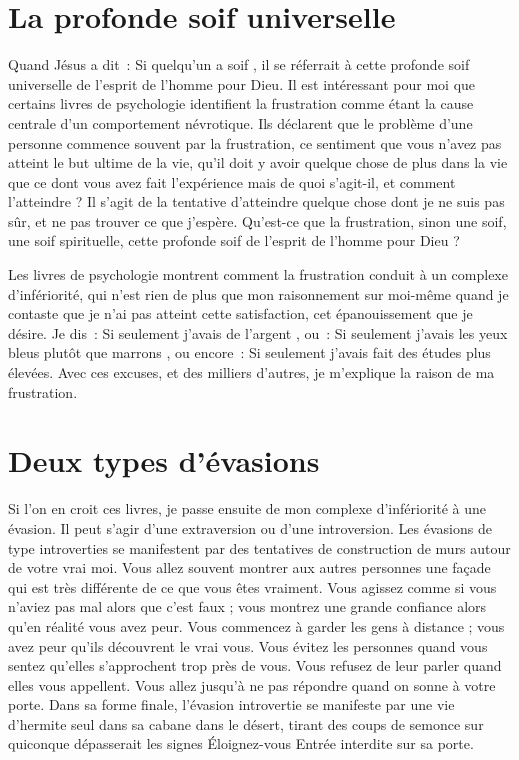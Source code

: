 \section*{La profonde soif universelle}

Quand Jésus a dit~: \og Si quelqu'un a soif \fg{}, il se réferrait
 à cette profonde soif universelle de l'esprit de l'homme pour Dieu.
 Il est intéressant pour moi que certains livres de psychologie
 identifient la frustration comme étant la cause centrale
 d'un comportement névrotique. Ils déclarent que le problème
 d'une personne commence souvent par la frustration,
 ce sentiment que vous n'avez pas atteint le but ultime de la vie,
 qu'il doit y avoir quelque chose de plus dans la vie que ce dont
 vous avez fait l'expérience \ocadr mais de quoi s'agit-il, et comment
 l'atteindre ?
 Il s'agit de la tentative d'atteindre quelque chose dont je ne suis pas sûr,
 et ne pas trouver ce que j'espère. Qu'est-ce que la frustration,
 sinon une soif, une soif spirituelle, cette profonde soif de l'esprit
 de l'homme pour Dieu ?

Les livres de psychologie montrent comment la frustration conduit
 à un complexe d'infériorité, qui n'est rien de plus que mon raisonnement
 sur moi-même quand je contaste que je n'ai pas atteint cette satisfaction,
 cet épanouissement que je désire. Je dis~:
 \og Si seulement j'avais de l'argent \fg{}, ou~:
 \og Si seulement j'avais les yeux bleus plutôt que marrons \fg{}, ou encore~:
 \og Si seulement j'avais fait des études plus élevées. \fg{}
 Avec ces excuses, et des milliers d'autres, je m'explique la raison
 de ma frustration.


\section*{Deux types d'évasions}

\begin{specialpar}{}
Si l'on en croit ces livres, je passe ensuite de mon complexe
 d'in\-fé\-rio\-ri\-té à une évasion.
 Il peut s'agir d'une extraversion ou d'une introversion.
 Les évasions de type introverties se manifestent par des tentatives
 de construction de murs autour de votre vrai moi.
 Vous allez souvent montrer aux autres personnes une façade qui est très
 différente de ce que vous êtes vraiment.
 Vous agissez comme si vous n'aviez pas mal alors que c'est faux ;
 vous montrez une grande confiance alors qu'en réalité vous avez peur.
 Vous commencez à garder les gens à distance ;
 vous avez peur qu'ils découvrent le vrai vous.
 Vous évitez les personnes quand vous sentez qu'elles s'approchent
 trop près de vous. Vous refusez de leur parler quand elles vous appellent.
 Vous allez jusqu'à ne pas répondre quand on sonne à votre porte.
 Dans sa forme finale, l'évasion introvertie se manifeste par une vie
 d'hermite seul dans sa cabane dans le désert, tirant des coups de semonce
 sur quiconque dépasserait les signes
 \og Éloignez-vous \ocadr Entrée interdite \fg{} sur sa porte.
\end{specialpar}

